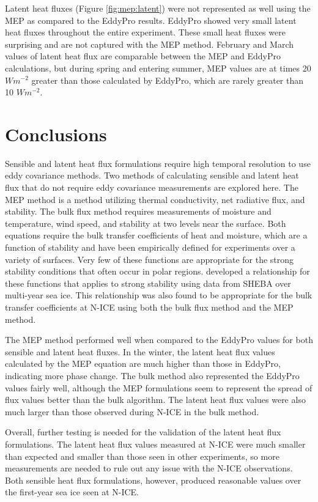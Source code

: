 Latent heat fluxes (Figure \ref{fig:mep:latent}) were not represented as well using the MEP as compared to the EddyPro results. EddyPro showed very small latent heat fluxes throughout the entire experiment. These small heat fluxes were surprising and are not captured with the MEP method. February and March values of latent heat flux are comparable between the MEP and EddyPro calculations, but during spring and entering summer, MEP values are at times 20 $Wm^{-2}$ greater than those calculated by EddyPro, which are rarely greater than 10 $Wm^{-2}$.

\section{Conclusions}
Sensible and latent heat flux formulations require high temporal resolution to use eddy covariance methods. Two methods of calculating sensible and latent heat flux that do not require eddy covariance measurements are explored here. The MEP method is a method utilizing thermal conductivity, net radiative flux, and stability. The bulk flux method requires measurements of moisture and temperature, wind speed, and stability at two levels near the surface. Both equations require the bulk transfer coefficients of heat and moisture, which are a function of stability and have been empirically defined for experiments over a variety of surfaces. Very few of these functions are appropriate for the strong stability conditions that often occur in polar regions. \citet{andreas:311} developed a relationship for these functions that applies to strong stability using data from SHEBA over multi-year sea ice. This relationship was also found to be appropriate for the bulk transfer coefficients at N-ICE using both the bulk flux method and the MEP method. 

The MEP method performed well when compared to the EddyPro values for both sensible and latent heat fluxes. In the winter, the latent heat flux values calculated by the MEP equation are much higher than those in EddyPro, indicating  more phase change. The bulk method also represented the EddyPro values fairly well, although the MEP formulations seem to represent the spread of flux values better than the bulk algorithm. The latent heat flux values were also much larger than those observed during N-ICE in the bulk method. 

Overall, further testing is needed for the validation of the latent heat flux formulations. The latent heat flux values measured at N-ICE were much smaller than expected and smaller than those seen in other experiments, so more measurements are needed to rule out any issue with the N-ICE observations. Both sensible heat flux formulations, however, produced reasonable values over the first-year sea ice seen at N-ICE. 




